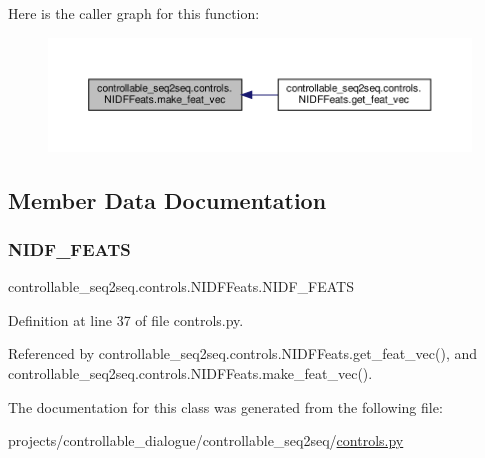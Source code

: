 Here is the caller graph for this function\+:
\nopagebreak
\begin{figure}[H]
\begin{center}
\leavevmode
\includegraphics[width=350pt]{classcontrollable__seq2seq_1_1controls_1_1NIDFFeats_a3496ec1cf7d5c7284e420585be7767e2_icgraph}
\end{center}
\end{figure}


\subsection{Member Data Documentation}
\mbox{\label{classcontrollable__seq2seq_1_1controls_1_1NIDFFeats_a1f71352a29e9ef0b1a1ee288d64614cd}} 
\subsubsection{\texorpdfstring{N\+I\+D\+F\+\_\+\+F\+E\+A\+TS}{NIDF\_FEATS}}
{\footnotesize\ttfamily controllable\+\_\+seq2seq.\+controls.\+N\+I\+D\+F\+Feats.\+N\+I\+D\+F\+\_\+\+F\+E\+A\+TS}



Definition at line 37 of file controls.\+py.



Referenced by controllable\+\_\+seq2seq.\+controls.\+N\+I\+D\+F\+Feats.\+get\+\_\+feat\+\_\+vec(), and controllable\+\_\+seq2seq.\+controls.\+N\+I\+D\+F\+Feats.\+make\+\_\+feat\+\_\+vec().



The documentation for this class was generated from the following file\+:\begin{DoxyCompactItemize}
\item 
projects/controllable\+\_\+dialogue/controllable\+\_\+seq2seq/\hyperlink{controls_8py}{controls.\+py}\end{DoxyCompactItemize}
